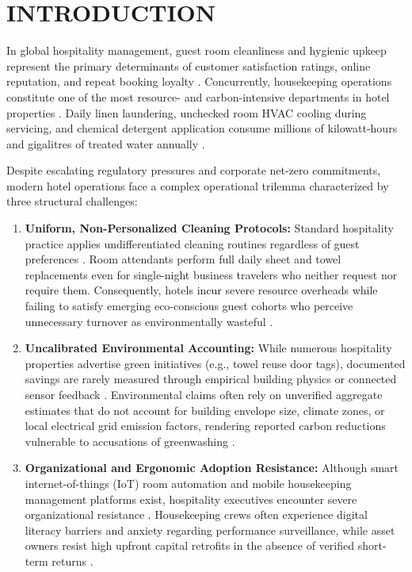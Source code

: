 \documentclass[11pt,a4paper]{article}
\begin{document}
\section{INTRODUCTION}

In global hospitality management, guest room cleanliness and hygienic upkeep represent the primary determinants of customer satisfaction ratings, online reputation, and repeat booking loyalty \cite{xiang2015,berezina2015,min2015}. Concurrently, housekeeping operations constitute one of the most resource- and carbon-intensive departments in hotel properties \cite{bohdanowicz2006,chan2013}. Daily linen laundering, unchecked room HVAC cooling during servicing, and chemical detergent application consume millions of kilowatt-hours and gigalitres of treated water annually \cite{han2018,wang2012}.

Despite escalating regulatory pressures and corporate net-zero commitments, modern hotel operations face a complex operational trilemma characterized by three structural challenges:
\begin{enumerate}
    \item \textbf{Uniform, Non-Personalized Cleaning Protocols:} Standard hospitality practice applies undifferentiated cleaning routines regardless of guest preferences \cite{goldstein2008}. Room attendants perform full daily sheet and towel replacements even for single-night business travelers who neither request nor require them. Consequently, hotels incur severe resource overheads while failing to satisfy emerging eco-conscious guest cohorts who perceive unnecessary turnover as environmentally wasteful \cite{kang2021,verma2018}.
    \item \textbf{Uncalibrated Environmental Accounting:} While numerous hospitality properties advertise green initiatives (e.g., towel reuse door tags), documented savings are rarely measured through empirical building physics or connected sensor feedback \cite{bonilla2011,hwang2019}. Environmental claims often rely on unverified aggregate estimates that do not account for building envelope size, climate zones, or local electrical grid emission factors, rendering reported carbon reductions vulnerable to accusations of greenwashing \cite{chan2013,cornell2023}.
    \item \textbf{Organizational and Ergonomic Adoption Resistance:} Although smart internet-of-things (IoT) room automation and mobile housekeeping management platforms exist, hospitality executives encounter severe organizational resistance \cite{ivanov2019,buhalis1998}. Housekeeping crews often experience digital literacy barriers and anxiety regarding performance surveillance, while asset owners resist high upfront capital retrofits in the absence of verified short-term returns \cite{krause2005,khanra2021}.
\end{enumerate}
\end{document}
